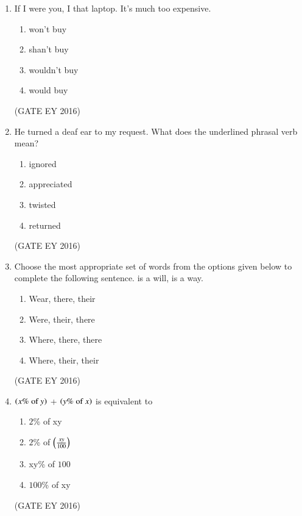 \documentclass[journal]{IEEEtran}
\begin{document}
\begin{enumerate}[label=Q.\arabic*.]
    \item If I were you, I \underline{\hspace{3cm}} that laptop. It's much too expensive.
    \begin{multicols}{2}
    \begin{enumerate}
        \item won't buy
        \item shan't buy
        \item wouldn't buy
        \item would buy
    \end{enumerate}
    \end{multicols}
\hfill{(GATE EY 2016)}

    \item He turned a deaf ear to my request. What does the underlined phrasal verb mean?
    \begin{multicols}{4}
    \begin{enumerate}
        \item ignored
        \item appreciated
        \item twisted
        \item returned
    \end{enumerate}
    \end{multicols}
\hfill{(GATE EY 2016)}

    \item Choose the most appropriate set of words from the options given below to complete the following sentence. \underline{\hspace{2cm}} is a will, \underline{\hspace{2cm}} is a way.
    \begin{multicols}{2}
    \begin{enumerate}
        \item Wear, there, their
        \item Were, their, there
        \item Where, there, there
        \item Where, their, their
    \end{enumerate}
    \end{multicols}
\hfill{(GATE EY 2016)}

    \item $\left(x\%\ \text{of}\ y\right)$ + $\left(y\%\ \text{of}\ x\right)$ is equivalent to
    \begin{multicols}{4}
    \begin{enumerate}
        \item $2$\% of xy
        \item $2$\% of $\left(\frac{xy}{100}\right)$
        \item xy\% of $100$
        \item $100$\% of xy
    \end{enumerate}
    \end{multicols}
\hfill{(GATE EY 2016)}


\end{enumerate}
\end{document}
